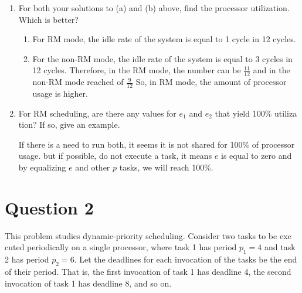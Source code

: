 \documentclass[12pt]{article}
\begin{document}
\begin{enumerate}
	
	\item 
	For both your solutions to (a) and (b) above, find the processor utilization.
	Which is better?
	\begin{qsolve}
		\begin{enumerate}
			\item For RM mode, the idle rate of the system is equal to 1 cycle in 12 cycles.
			\item For the non-RM mode, the idle rate of the system is equal to 3 cycles in 12 cycles. ُTherefore, in the RM mode, the number can be $\frac{11}{12}$ and in the non-RM mode reached of $\frac{9}{12}$ So, in RM mode, the amount of processor usage is higher.
		\end{enumerate}
	\end{qsolve}
	
	
	
	\item 
	For RM scheduling, are there any values for $e_1$ and $e_2$ that yield 100\% utiliza
	tion? If so, give an example.
	\begin{qsolve}
		If there is a need to run both, it seems it is not shared for 100\% of processor usage. but if possible, do not execute a task, it means $e$ is equal to zero and by equalizing $e$ and other $p$ tasks, we will reach 100\%.
	\end{qsolve}
\end{enumerate}
\vfil
\clearpage












\section{Question 2}
This problem studies dynamic-priority scheduling. Consider two tasks to be exe
cuted periodically on a single processor, where task 1 has period $p_1 = 4$ and task
2 has period $p_2 = 6$. Let the deadlines for each invocation of the tasks be the end
of their period. That is, the first invocation of task 1 has deadline 4, the second
invocation of task 1 has deadline 8, and so on.
\end{document}
